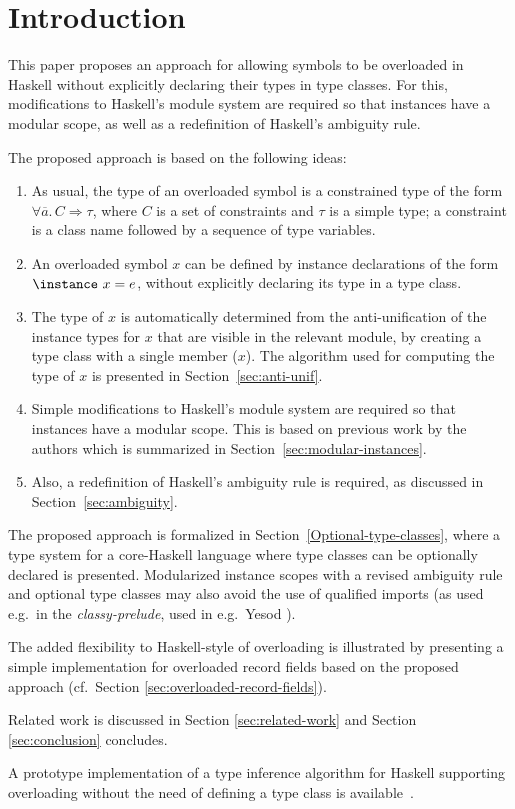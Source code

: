 \section{Introduction}
\label{sec:intro}

This paper proposes an approach for allowing symbols to be overloaded
in Haskell without explicitly declaring their types in type
classes. For this, modifications to Haskell's module system are
required so that instances have a modular scope, as well as a
redefinition of Haskell's ambiguity rule.

The proposed approach is based on the following ideas:

\begin{enumerate}

 \item As usual, the type of an overloaded symbol is a constrained
   type of the form $\forall \overline{a}.\,C \Rightarrow \tau$, where
   $C$ is a set of constraints and $\tau$ is a simple type; a
   constraint is a class name followed by a sequence of type
   variables.

\item An overloaded symbol $x$ can be defined by instance declarations
  of the form $\instance\ x=e$, without explicitly declaring its type
  in a type class.

\item The type of $x$ is automatically determined from the
  anti-unification of the instance types for $x$ that are visible in
  the relevant module, by creating a type class with a single member
  ($x$). The algorithm used for computing the type of $x$ is presented
  in Section~\ref{sec:anti-unif}.

\item Simple modifications to Haskell's module system are required so
  that instances have a modular scope. This is based on previous work
  by the authors which is summarized in
  Section~\ref{sec:modular-instances}.

\item Also, a redefinition of Haskell's ambiguity rule is required, as
  discussed in Section~\ref{sec:ambiguity}.

\end{enumerate}

The proposed approach is formalized in
Section~\ref{Optional-type-classes}, where a type system for a
core-Haskell language where type classes can be optionally declared is
presented. Modularized instance scopes with a revised ambiguity rule
and optional type classes may also avoid the use of qualified imports
(as used e.g.~in the {\em classy-prelude}, used in e.g.~Yesod
\cite{Yesod}).

The added flexibility to Haskell-style of overloading is illustrated
by presenting a simple implementation for overloaded record fields
based on the proposed approach (cf.~Section
\ref{sec:overloaded-record-fields}).

Related work is discussed in Section \ref{sec:related-work} and
Section \ref{sec:conclusion} concludes.

A prototype implementation of a type inference algorithm for Haskell supporting
overloading without the need of defining a type class is available~\cite{opt-rep}.
